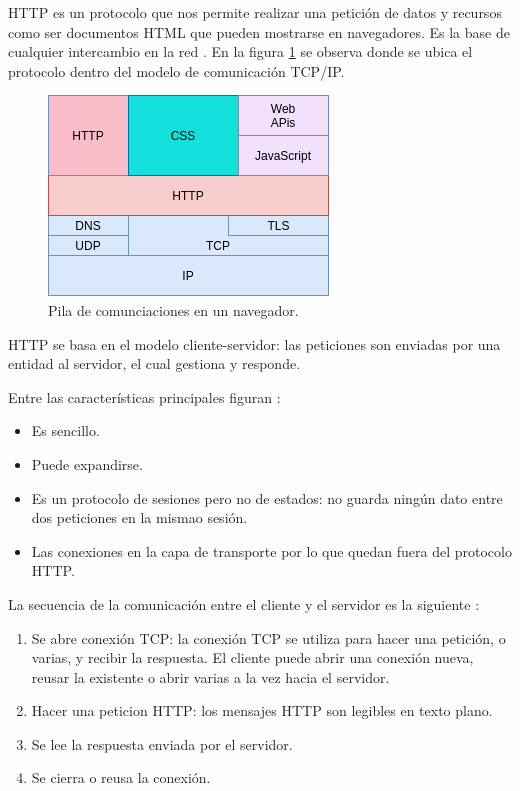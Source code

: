 HTTP es un protocolo que nos permite realizar una petición de datos y recursos como ser documentos HTML que pueden mostrarse en navegadores. Es la base de cualquier intercambio en la red \citep{WEBSITE:19}. En la figura \ref{fig:Protocolo HTTP } se observa donde se ubica el protocolo dentro del modelo de comunicación TCP/IP.


\begin{figure}[ht]
	\centering
	\includegraphics[scale=.5]{./Figures/http.png}
	\caption{Pila de comunciaciones en un navegador.}
	\label{fig:Protocolo HTTP }
\end{figure}

HTTP se basa en el modelo cliente-servidor: las peticiones son enviadas por una entidad al servidor, el cual gestiona y responde.

Entre las características principales figuran \citep{WEBSITE:19}:
\begin{itemize}
\item Es sencillo.
\item Puede expandirse.
\item Es un protocolo de sesiones pero no de estados: no guarda ningún dato entre dos peticiones en la mismao sesión.
\item Las conexiones en la capa de transporte por lo que quedan fuera del protocolo HTTP.
\end{itemize}

La secuencia de la comunicación entre el cliente y el servidor es la siguiente \citep{WEBSITE:19}:
\begin{enumerate}
\item Se abre conexión TCP: la conexión TCP se utiliza para hacer una petición, o varias, y recibir la respuesta. El cliente puede abrir una conexión nueva, reusar la existente o abrir varias a la vez hacia el servidor.
\item Hacer una peticion HTTP: los mensajes HTTP son legibles en texto plano.
\item Se lee la respuesta enviada por el servidor.
\item Se cierra o reusa la conexión.
\end{enumerate}

